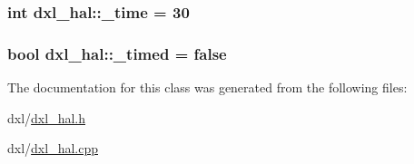 \subsubsection[{\+\_\+time}]{\setlength{\rightskip}{0pt plus 5cm}int dxl\+\_\+hal\+::\+\_\+time = 30\hspace{0.3cm}{\ttfamily [private]}}\label{classdxl__hal_ae3d8733b5ca778b070218765ca0746ac}
\hypertarget{classdxl__hal_a10d474daa3ca42b5c5ceb6558a955ca1}{}
\subsubsection[{\+\_\+timed}]{\setlength{\rightskip}{0pt plus 5cm}bool dxl\+\_\+hal\+::\+\_\+timed = false\hspace{0.3cm}{\ttfamily [private]}}\label{classdxl__hal_a10d474daa3ca42b5c5ceb6558a955ca1}


The documentation for this class was generated from the following files\+:\begin{DoxyCompactItemize}
\item 
dxl/\hyperlink{dxl__hal_8h}{dxl\+\_\+hal.\+h}\item 
dxl/\hyperlink{dxl__hal_8cpp}{dxl\+\_\+hal.\+cpp}\end{DoxyCompactItemize}
